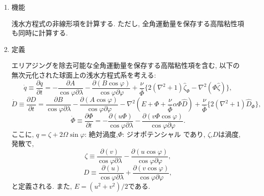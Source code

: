 \documentclass[a4j,fleqn]{jarticle}
\begin{document}
\begin{enumerate}

\item 機能

浅水方程式の非線形項を計算する. 
ただし, 全角運動量を保存する高階粘性項も同時に計算する.

\item 定義

エリアジングを除去可能な全角運動量を保存する高階粘性項を含む,
以下の無次元化された球面上の浅水方程式系を考える:
\begin{equation}
\dot{q}\equiv\frac{\partial q}{\partial t}
=-\frac{\partial A}{\cos\varphi\partial\lambda}
-\frac{\partial(B\cos\varphi)}{\cos\varphi\partial\varphi}
+\frac{\nu}{\bar\Phi}\{2(\nabla^2+1)\hat\zeta_{\Phi}-\nabla^2(\Phi\hat\zeta)\},
\end{equation}
\begin{equation}
\dot{D}\equiv\frac{\partial D}{\partial t}
=\frac{\partial B}{\cos\varphi\partial\lambda}
-\frac{\partial(A\cos\varphi)}{\cos\varphi\partial\varphi}
-\nabla^2(E+\Phi+\frac{\nu}{\bar\Phi}\alpha\Phi\hat D)
+\frac{\nu}{\bar\Phi}\{2(\nabla^2+1)\hat D_{\Phi}\},
\end{equation}
\begin{equation}
\dot{\Phi}\equiv\frac{\partial \Phi}{\partial t}
=-\frac{\partial(u\Phi)}{\cos\varphi\partial\lambda}
-\frac{\partial(v\Phi\cos\varphi)}{\cos\varphi\partial\varphi}.
\end{equation}
ここに, $q=\zeta+2\Omega\sin\varphi$: 絶対渦度,$\Phi$: ジオポテンシャル
であり, $\zeta$,$D$は渦度, 発散で,
\begin{equation}
\zeta\equiv
\frac{\partial(v)}{\cos\varphi\partial\lambda}
-\frac{\partial(u\cos\varphi)}{\cos\varphi\partial\varphi},
\end{equation}
\begin{equation}
D\equiv
\frac{\partial(u)}{\cos\varphi\partial\lambda}
+\frac{\partial(v\cos\varphi)}{\cos\varphi\partial\varphi},
\end{equation}
と定義される. また, $E=(u^2+v^2)/2$である.


\end{enumerate}
\end{document}
